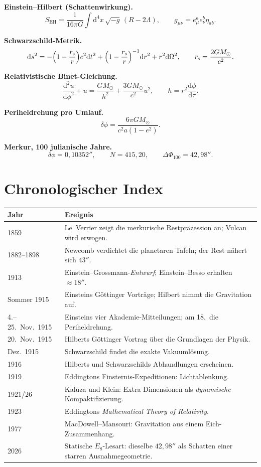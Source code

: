 \documentclass[11pt,a4paper]{article}
\theoremstyle{definition}
\theoremstyle{remark}
\newcommand{\eh}{S_{\mathrm{EH}}}
\newcommand{\rs}{r_{\mathrm{s}}}
\newcommand{\MS}{M_{\odot}}
\newcommand{\dphi}{\delta\phi}
\begin{document}
\textbf{Einstein--Hilbert (Schattenwirkung).}
\[
\eh=\frac{1}{16\pi G}\int\mathrm{d}^4x\,\sqrt{-g}\,(R-2\Lambda),\qquad
g_{\mu\nu}=e_\mu^a e_\nu^b\eta_{ab}.
\]

\textbf{Schwarzschild-Metrik.}
\[
\mathrm{d}s^2=-\Bigl(1-\frac{\rs}{r}\Bigr)c^2\mathrm{d}t^2
+\Bigl(1-\frac{\rs}{r}\Bigr)^{-1}\mathrm{d}r^2
+r^2\mathrm{d}\Omega^2,\qquad \rs=\frac{2G\MS}{c^2}.
\]

\textbf{Relativistische Binet-Gleichung.}
\[
\frac{\mathrm{d}^2 u}{\mathrm{d}\phi^2}+u=\frac{G\MS}{h^2}+\frac{3G\MS}{c^2}u^2,\qquad
h=r^2\frac{\mathrm{d}\phi}{\mathrm{d}\tau}.
\]

\textbf{Periheldrehung pro Umlauf.}
\[
\dphi=\frac{6\pi G\MS}{c^2 a(1-e^2)}.
\]

\textbf{Merkur, 100 julianische Jahre.}
\[
\dphi=0{,}10352'',\qquad N=415{,}20,\qquad \Delta\Phi_{100}=42{,}98''.
\]

\section{Chronologischer Index}

\begin{center}
\begin{tabular}{@{}lp{}@{}}
\toprule
Jahr & Ereignis \\
\midrule
1859 & Le~Verrier zeigt die merkurische Restpräzession an; Vulcan wird erwogen. \\
1882--1898 & Newcomb verdichtet die planetaren Tafeln; der Rest nähert sich \(43''\). \\
1913 & Einstein--Grossmann-\emph{Entwurf}; Einstein--Besso erhalten \(\approx 18''\). \\
Sommer 1915 & Einsteins Göttinger Vorträge; Hilbert nimmt die Gravitation auf. \\
4.--25.~Nov.~1915 & Einsteins vier Akademie-Mitteilungen; am 18.~die Periheldrehung. \\
20.~Nov.~1915 & Hilberts Göttinger Vortrag über die Grundlagen der Physik. \\
Dez.~1915 & Schwarzschild findet die exakte Vakuumlösung. \\
1916 & Hilberts und Schwarzschilds Abhandlungen erscheinen. \\
1919 & Eddingtons Finsternis-Expeditionen: Lichtablenkung. \\
1921/26 & Kaluza und Klein: Extra-Dimensionen als \emph{dynamische} Kompaktifizierung. \\
1923 & Eddingtons \emph{Mathematical Theory of Relativity}. \\
1977 & MacDowell--Mansouri: Gravitation aus einem Eich-Zusammenhang. \\
2026 & Statische \(E_8\)-Lesart: dieselbe \(42{,}98''\) als Schatten einer starren Ausnahmegeometrie. \\
\bottomrule
\end{tabular}
\end{center}
\end{document}
